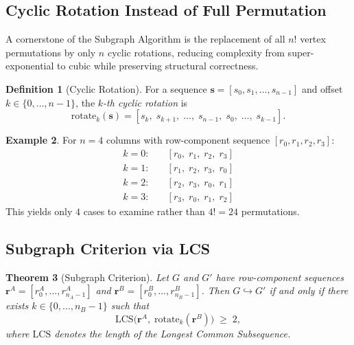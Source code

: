 ﻿\documentclass[12pt,a4paper]{article}
\theoremstyle{plain}
\newtheorem{theorem}{Theorem}[section]
\theoremstyle{definition}
\newtheorem{definition}[theorem]{Definition}
\newtheorem{example}[theorem]{Example}
\theoremstyle{remark}
\begin{document}
	\subsection{Cyclic Rotation Instead of Full Permutation}

	A cornerstone of the Subgraph Algorithm is the replacement of all $n!$
	vertex permutations by only $n$ cyclic rotations, reducing complexity from
	super-exponential to cubic while preserving structural correctness.

	\begin{definition}[Cyclic Rotation]
		\label{def:rotation}
		For a sequence $\mathbf{s} = [s_0, s_1, \ldots, s_{n-1}]$ and offset
		$k \in \{0, \ldots, n-1\}$, the \emph{$k$-th cyclic rotation} is
		\[
		\mathrm{rotate}_k(\mathbf{s})
		= [s_k,\; s_{k+1},\; \ldots,\; s_{n-1},\; s_0,\; \ldots,\; s_{k-1}].
		\]
	\end{definition}

	\begin{example}
		For $n = 4$ columns with row-component sequence $[r_0, r_1, r_2, r_3]$:
		\begin{align*}
			k = 0{:}\quad & [r_0,\; r_1,\; r_2,\; r_3] \\
			k = 1{:}\quad & [r_1,\; r_2,\; r_3,\; r_0] \\
			k = 2{:}\quad & [r_2,\; r_3,\; r_0,\; r_1] \\
			k = 3{:}\quad & [r_3,\; r_0,\; r_1,\; r_2]
		\end{align*}
		This yields only $4$ cases to examine rather than $4! = 24$ permutations.
	\end{example}

	\subsection{Subgraph Criterion via LCS}

	\begin{theorem}[Subgraph Criterion]
		\label{thm:subgraph_criterion}
		Let $G$ and $G'$ have row-component sequences
		$\mathbf{r}^A = [r_0^A, \ldots, r_{n_A-1}^A]$ and
		$\mathbf{r}^B = [r_0^B, \ldots, r_{n_B-1}^B]$.
		Then $G \hookrightarrow G'$ if and only if there exists
		$k \in \{0, \ldots, n_B - 1\}$ such that
		\[
		\mathrm{LCS}\!\bigl(\mathbf{r}^A,\;
		\mathrm{rotate}_k(\mathbf{r}^B)\bigr) \;\geq\; 2,
		\]
		where $\mathrm{LCS}$ denotes the length of the Longest Common Subsequence.
	\end{theorem}
\end{document}
